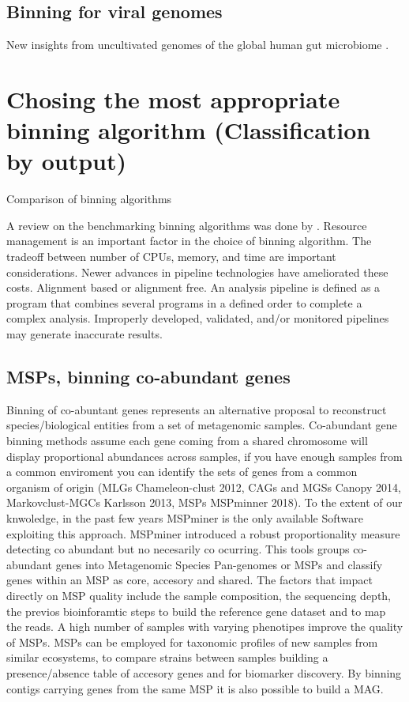 \documentclass{article}
\begin{document}
\subsection*{Binning for viral genomes}
New insights from uncultivated genomes of the global human gut microbiome \cite{nayfach2019new}.

\section*{Chosing the most appropriate binning algorithm (Classification by output)}
\begin{sidewaystable}
\begin{tiny}
\centering
\caption[Comparison of binning algorithms]{Comparison of binning algorithms}
	
\label{Tbinningsoftware}
\end{tiny}
\end{sidewaystable}
A review on the benchmarking binning algorithms was done by .
Resource management is an important factor in the choice of binning algorithm.
The tradeoff between number of \glspl{CPU}, memory, and time are important considerations.
Newer advances in pipeline technologies have ameliorated these costs.
Alignment based or alignment free.
An analysis pipeline is defined as a program that combines several programs in a defined order to complete a complex analysis.
Improperly developed, validated, and/or monitored pipelines may generate inaccurate results.

\subsection*{MSPs, binning co-abundant genes}
Binning of co-abuntant genes represents an alternative proposal to reconstruct species/biological entities from a set of metagenomic samples.
Co-abundant gene binning methods assume each gene coming from a shared chromosome will display proportional abundances across samples, if you have enough samples from a common enviroment you can identify the sets of genes from a common organism of origin (MLGs Chameleon-clust 2012, CAGs and MGSs Canopy 2014, Markovclust-MGCs Karlsson 2013, MSPs MSPminner 2018).
To the extent of our knwoledge, in the past few years MSPminer is the only available Software exploiting this approach. MSPminer introduced a robust proportionality measure detecting co abundant but no necesarily co ocurring. This tools groups co-abundant genes into Metagenomic Species Pan-genomes or \glspl{MSP} and classify genes within an MSP as core, accesory and shared.  
The factors that impact directly on \gls{MSP} quality include the sample composition, the sequencing depth, the previos bioinforamtic steps to build the reference gene dataset and to map the reads.
A high number of samples with varying phenotipes improve the quality of \glspl{MSP}.
MSPs can be employed for taxonomic profiles of new samples from similar ecosystems, to compare strains between samples building a presence/absence table of accesory genes and for biomarker discovery. By binning contigs carrying genes from the same MSP it is also possible to build a \gls{MAG}.
\end{document}

